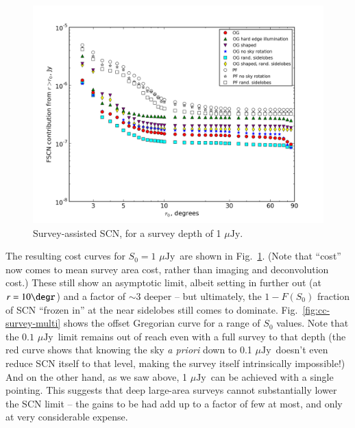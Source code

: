 \documentclass{aa}
\newcommand{\uJy}{$\mu\mathrm{Jy}$}
\begin{document}
\begin{figure}
\includegraphics[width=\columnwidth]{costcurve-survey-1uJy}
\caption{\label{fig:cc-survey-1uJy}Survey-assisted SCN, for a survey depth of 1 \uJy.}
\end{figure}

The resulting cost curves for $S_0=1$ \uJy\ are shown in Fig.~\ref{fig:cc-survey-1uJy}. (Note that ``cost'' now comes to mean survey area cost, rather than imaging and deconvolution cost.) These still show an asymptotic limit, albeit setting in further out (at $r=10\degr$) and a factor of $\sim3$ deeper -- but ultimately, the $1-F(S_0)$ fraction of SCN ``frozen in'' at the near sidelobes still comes to dominate. Fig.~\ref{fig:cc-survey-multi} shows the offset Gregorian curve for a range of $S_0$ values. Note that the $0.1$ \uJy\ limit remains out of reach even with a full survey to that depth (the red curve shows that knowing the sky {\em a priori} down to 0.1 \uJy\ doesn't even reduce SCN itself to that level, making the survey itself intrinsically impossible!) And on the other hand, as we saw above, 1 \uJy\ can be achieved with a single pointing. This suggests that deep large-area surveys cannot substantially lower the SCN limit -- the gains to be had add up to a factor of few at most, and only at very 
considerable expense.
\end{document}
